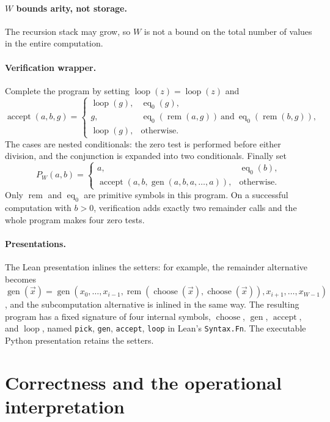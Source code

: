 \documentclass[11pt]{article}
\newcommand{\rem}{\operatorname{rem}}
\newcommand{\eqzero}{\operatorname{eq}_0}
\newcommand{\Gen}{\operatorname{gen}}
\newcommand{\Pick}{\operatorname{choose}}
\newcommand{\AcceptCandidate}{\operatorname{accept}}
\newcommand{\Loop}{\operatorname{loop}}
\newcommand{\lean}[1]{\nolinkurl{#1}}
\begin{document}
\paragraph{$W$ bounds arity, not storage.}
The recursion stack may grow, so $W$ is not a bound on the total number of
values in the entire computation.

\paragraph{Verification wrapper.}
Complete the program by setting $\Loop(z)=\Loop(z)$ and
\[
\AcceptCandidate(a,b,g)=
\begin{cases}
\Loop(g),&\eqzero(g),\\
g,&\eqzero(\rem(a,g))\ \text{and}\ \eqzero(\rem(b,g)),\\
\Loop(g),&\text{otherwise}.
\end{cases}
\]
The cases are nested conditionals: the zero test is performed before either
division, and the conjunction is expanded into two conditionals.
Finally set
\[
P_W(a,b)=
\begin{cases}
a,&\eqzero(b),\\
\AcceptCandidate(a,b,\Gen(a,b,a,\ldots,a)),&\text{otherwise}.
\end{cases}
\]
Only $\rem$ and $\eqzero$ are primitive symbols in this program.
On a successful computation with $b>0$, verification adds exactly two
remainder calls and the whole program makes four zero tests.

\paragraph{Presentations.}
The Lean presentation inlines the setters: for example, the remainder
alternative becomes
$\Gen(\vec x)=\Gen(x_0,\ldots,x_{i-1},
\rem(\Pick(\vec x),\Pick(\vec x)),x_{i+1},\ldots,x_{W-1})$,
and the subcomputation alternative is inlined in the same way.
The resulting program has a fixed signature of four internal symbols,
$\Pick$, $\Gen$, $\AcceptCandidate$, and $\Loop$, named \lean{pick},
\lean{gen}, \lean{accept}, \lean{loop} in Lean's \lean{Syntax.Fn}.
The executable Python presentation retains the setters.

\section{Correctness and the operational interpretation}\label{sec:correctness}
\end{document}

